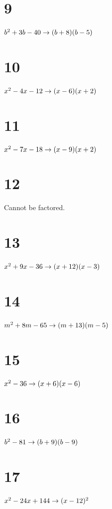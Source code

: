 \documentclass{article}
\theoremstyle{definition}
\begin{document}
\section*{9}
$b^2+3b-40\newline\rightarrow (b+8)(b-5)$

\section*{10}
$x^2-4x-12\newline\rightarrow (x-6)(x+2)$

\section*{11}
$x^2-7x-18\newline\rightarrow (x-9)(x+2)$

\section*{12}
Cannot be factored.

\section*{13}
$x^2+9x-36\newline\rightarrow (x+12)(x-3)$

\section*{14}
$m^2+8m-65\newline\rightarrow (m+13)(m-5)$

\section*{15}
$x^2-36\newline\rightarrow (x+6)(x-6)$

\section*{16}
$b^2-81\newline\rightarrow (b+9)(b-9)$

\section*{17}
$x^2-24x+144\newline\rightarrow (x-12)^2$
\end{document}

